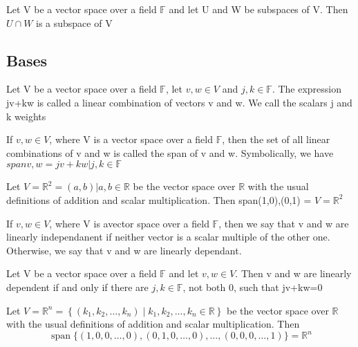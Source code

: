 \documentclass{article}
\begin{document}
\begin{theorem}
    Let V be a vector space over a field $\mathbb{F}$ and let U and W be
    subspaces of V. Then $ U \cap W$ is a subspace of V
\end{theorem}

\subsection{Bases}

\begin{definition}
    Let V be a vector space over a field $\mathbb{F}$, let $v,w \in V$ and
    $j,k \in \mathbb{F}$. The expression jv+kw is called a linear combination
    of vectors v and w. We call the scalars j and k weights
\end{definition}

\begin{definition}[Span]
    If $v,w \in V$, where V is a vector space over a field $\mathbb{F}$, then
    the set of all linear combinations of v and w is called the span of v and w.
    Symbolically, we have  $ span{v,w} = {jv+kw|j,k \in \mathbb{F}} $
\end{definition}

\begin{theorem}
    Let $V=\mathbb{R}^2 = {(a,b)|a,b \in \mathbb{R}}$ be the vector space over
    $\mathbb{R}$ with the usual definitions of addition and scalar multiplication.
    Then span{(1,0),(0,1)} = $V=\mathbb{R}^2$
\end{theorem}

\begin{definition}
    If $v,w \in V$, where V is avector space over a field $\mathbb{F}$, then we
    say that v and w are linearly independanent if neither vector is a scalar
    multiple of the other one. Otherwise, we say that v and w are linearly dependant.
\end{definition}

\begin{theorem}
    Let V be a vector space over a field $\mathbb{F}$ and let $v,w \in V$. Then
    v and w are linearly dependent if and only if there are $j,k \in \mathbb{F}$,
    not both 0, such that jv+kw=0
\end{theorem}

\begin{theorem}
Let $V=\mathbb{R}^{n}=\left\{\left(k_{1}, k_{2}, \ldots, k_{n}\right) \mid k_{1}, k_{2}, \ldots, k_{n} \in \mathbb{R}\right\}$ be the vector space over $\mathbb{R}$ with the
usual definitions of addition and scalar multiplication. Then
$$
\operatorname{span}\{(1,0,0, \ldots, 0),(0,1,0, \ldots, 0), \ldots,(0,0,0, \ldots, 1)\}=\mathbb{R}^{n}
$$
\end{theorem}
\end{document}
